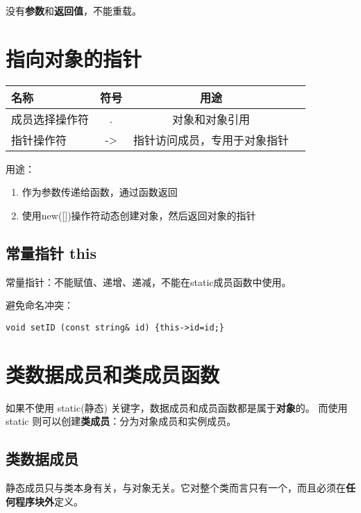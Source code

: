 没有\textbf{参数}和\textbf{返回值}，不能重载。

\section{指向对象的指针}

\begin{table}[!htbp]
    \centering
    \begin{tabular}{lccc}
        \toprule
        名称           & 符号 & 用途                         \\
        \midrule
        成员选择操作符 & .    & 对象和对象引用               \\
        指针操作符     & ->   & 指针访问成员，专用于对象指针 \\
        \bottomrule
    \end{tabular}
\end{table}

用途：
\begin{enumerate}
    \item 作为参数传递给函数，通过函数返回
    \item 使用new([])操作符动态创建对象，然后返回对象的指针
\end{enumerate}

\subsection{常量指针 this}

常量指针：不能赋值、递增、递减，不能在static成员函数中使用。

避免命名冲突：
\begin{lstlisting}[frame=shadowbox]
void setID (const string& id) {this->id=id;}
\end{lstlisting}

\section{类数据成员和类成员函数}

如果不使用 static(静态) 关键字，数据成员和成员函数都是属于\textbf{对象}的。
而使用 static 则可以创建\textbf{类成员}：分为对象成员和实例成员。

\subsection{类数据成员}

静态成员只与类本身有关，与对象无关。它对整个类而言只有一个，而且必须在\textbf{任何程序块外}定义。

